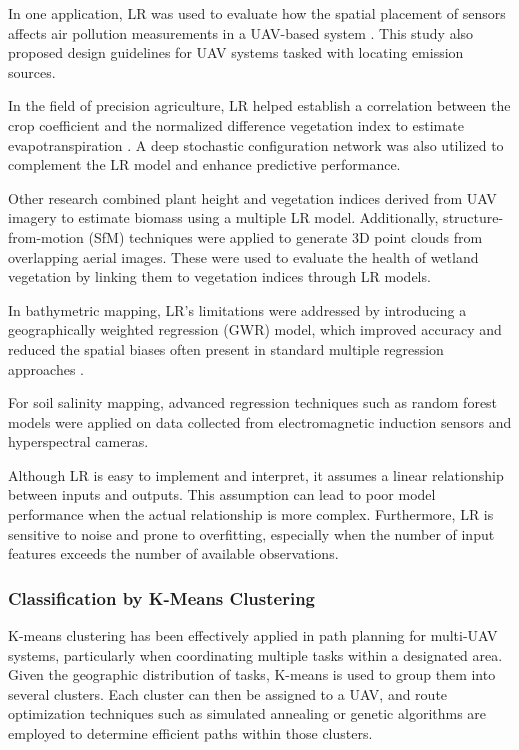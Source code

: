 In one application, LR was used to evaluate how the spatial placement of sensors affects air pollution measurements in a UAV-based system \cite{villa2016uav}. This study also proposed design guidelines for UAV systems tasked with locating emission sources.

In the field of precision agriculture, LR helped establish a correlation between the crop coefficient and the normalized difference vegetation index to estimate evapotranspiration \cite{niu2020estimating}. A deep stochastic configuration network was also utilized to complement the LR model and enhance predictive performance.

Other research combined plant height and vegetation indices derived from UAV imagery to estimate biomass using a multiple LR model. Additionally, structure-from-motion (SfM) techniques were applied to generate 3D point clouds from overlapping aerial images. These were used to evaluate the health of wetland vegetation by linking them to vegetation indices through LR models.

In bathymetric mapping, LR’s limitations were addressed by introducing a geographically weighted regression (GWR) model, which improved accuracy and reduced the spatial biases often present in standard multiple regression approaches .

For soil salinity mapping, advanced regression techniques such as random forest models were applied on data collected from electromagnetic induction sensors and hyperspectral cameras.

Although LR is easy to implement and interpret, it assumes a linear relationship between inputs and outputs. This assumption can lead to poor model performance when the actual relationship is more complex. Furthermore, LR is sensitive to noise and prone to overfitting, especially when the number of input features exceeds the number of available observations.



\subsubsection{Classification by K-Means Clustering}

K-means clustering has been effectively applied in path planning for multi-UAV systems, particularly when coordinating multiple tasks within a designated area. Given the geographic distribution of tasks, K-means is used to group them into several clusters. Each cluster can then be assigned to a UAV, and route optimization techniques such as simulated annealing or genetic algorithms are employed to determine efficient paths within those clusters.

